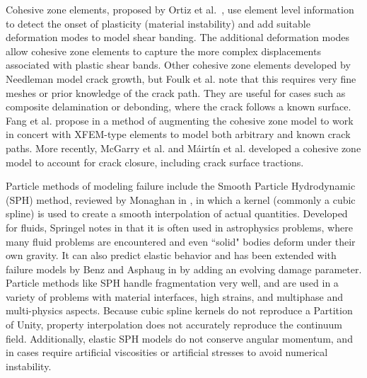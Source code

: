 Cohesive zone elements, proposed by Ortiz et al.~\cite{ortiz1987finite}, use element level information to detect the onset of plasticity (material instability) and add suitable deformation modes to model shear banding.
The additional deformation modes allow cohesive zone elements to capture the more complex displacements associated with plastic shear bands.
Other cohesive zone elements developed by Needleman\cite{needleman1987continuum} model crack growth, but Foulk et al.\cite{foulk2000formulation} note that this requires very fine meshes or prior knowledge of the crack path.
They are useful for cases such as composite delamination or debonding, where the crack follows a known surface.
Fang et al. propose in \cite{fang2011augmented} a method of augmenting the cohesive zone model to work in concert with XFEM-type elements to model both arbitrary and known crack paths.
More recently, McGarry et al. \cite{mcgarry2014potential} and M\'airt\'in et al. \cite{mairtin2014potential} developed a cohesive zone model to account for crack closure, including crack surface tractions.

Particle methods of modeling failure include the Smooth Particle Hydrodynamic (SPH) method, reviewed by Monaghan in \cite{monaghan2005smoothed}, in which a kernel (commonly a cubic spline) is used to create a smooth interpolation of actual quantities.
Developed for fluids, Springel notes in \cite{springel2010smoothed} that it is often used in astrophysics problems, where many fluid problems are encountered and even ``solid" bodies deform under their own gravity.
It can also predict elastic behavior and has been extended with failure models by Benz and Asphaug in \cite{benz1995simulations} by adding an evolving damage parameter.
Particle methods like SPH handle fragmentation very well, and are used in a variety of problems with material interfaces, high strains, and multiphase and multi-physics aspects.
Because cubic spline kernels do not reproduce a Partition of Unity, property interpolation does not accurately reproduce the continuum field.
Additionally, elastic SPH models do not conserve angular momentum, and in cases require artificial viscosities or artificial stresses to avoid numerical instability.


